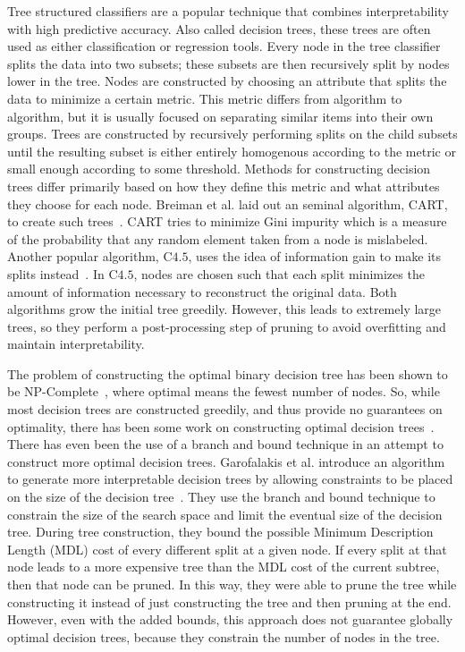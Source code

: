 Tree structured classifiers are a popular technique that combines interpretability with high predictive accuracy.
Also called decision trees, these trees are often used as either classification or regression tools.
Every node in the tree classifier splits the data into two subsets; these subsets are then recursively split by nodes lower in the tree.
Nodes are constructed by choosing an attribute that splits the data to minimize a certain metric.
This metric differs from algorithm to algorithm, but it is usually focused on separating similar items into their own groups.%
Trees are constructed by recursively performing splits on the child subsets until the resulting subset is either entirely homogenous according to the metric or small enough according to some threshold.
Methods for constructing decision trees differ primarily based on how they define this metric and what attributes they choose for each node.
Breiman et al. laid out an seminal algorithm, CART, to create such trees~\cite{BreimanFrOlSt84}.
CART tries to minimize Gini impurity which is a measure of the probability that any random element taken from a node is mislabeled.
Another popular algorithm, C$4.5$, uses the idea of information gain to make its splits instead~\cite{Quinlan93}.
In C$4.5$, nodes are chosen such that each split minimizes the amount of information necessary to reconstruct the original data.
Both algorithms grow the initial tree greedily.
However, this leads to extremely large trees, so they perform a post-processing step of pruning to avoid overfitting and maintain interpretability.

The problem of constructing the optimal binary decision tree has been shown to be NP-Complete~\cite{HyafilRi76}, where optimal means the fewest number of nodes.
So, while most decision trees are constructed greedily, and thus provide no guarantees on optimality, there has been some work on constructing optimal decision trees~\cite{Moret82}.
There has even been the use of a branch and bound technique in an attempt to construct more optimal decision trees.
Garofalakis et al. introduce an algorithm to generate more interpretable decision trees by allowing constraints to be placed on the size of the decision tree~\cite{GarofalakisHyRaSh00}.
They use the branch and bound technique to constrain the size of the search space and limit the eventual size of the decision tree.
During tree construction, they bound the possible Minimum Description Length (MDL) cost of every different split at a given node.
If every split at that node leads to a more expensive tree than the MDL cost of the current subtree, then that node can be pruned.
In this way, they were able to prune the tree while constructing it instead of just constructing the tree and then pruning at the end.
However, even with the added bounds, this approach does not guarantee globally optimal decision trees, because they constrain the number of nodes in the tree.

